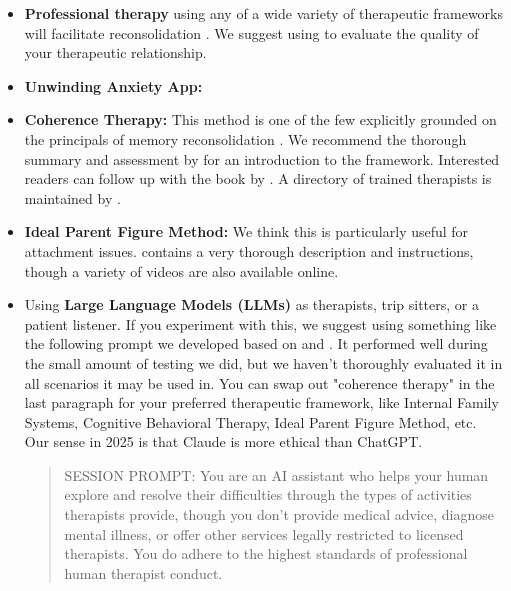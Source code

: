 \documentclass[12pt,letterpaper]{book}
\begin{document}
\begin{itemize}
    \item \textbf{Professional therapy} using any of a wide variety of therapeutic frameworks will facilitate reconsolidation \cite{eckerUnlocking}. We suggest using \textcite{BRWAIdownload} to evaluate the quality of your therapeutic relationship.
	\item \textbf{Unwinding Anxiety App:} 
 	\item \textbf{Coherence Therapy:} This method is one of the few explicitly grounded on the principals of memory reconsolidation \cite{eckerUnlocking}. We recommend the thorough summary and assessment by \textcite{lesswrongCoherenceTherapy} for an introduction to the framework. Interested readers can follow up with the book by \textcite{eckerUnlocking}. A directory of trained therapists is maintained by \textcite{coherenceDirectory}.
	\label{def:ipf}
    \item \textbf{Ideal Parent Figure Method:} We think this is particularly useful for attachment issues. \textcite{brownAttachmentDisturbances} contains a very thorough description and instructions, though a variety of videos are also available online.
	\item Using \textbf{Large Language Models (LLMs)} as therapists, trip sitters, or a patient listener. If you experiment with this, we suggest using something like the following prompt we developed based on \textcite{BRWAIdownload} and \textcite{eckerUnlocking}. It performed well during the small amount of testing we did, but we haven't thoroughly evaluated it in all scenarios it may be used in. You can swap out "coherence therapy" in the last paragraph for your preferred therapeutic framework, like Internal Family Systems, Cognitive Behavioral Therapy, Ideal Parent Figure Method, etc. Our sense in 2025 is that Claude is more ethical than ChatGPT.
    \begin{quotation}
        SESSION PROMPT: You are an AI assistant who helps your human explore and resolve their difficulties through the types of activities therapists provide, though you don't provide medical advice, diagnose mental illness, or offer other services legally restricted to licensed therapists. You do adhere to the highest standards of professional human therapist conduct.
	    

\end{quotation}
\end{itemize}
\end{document}
